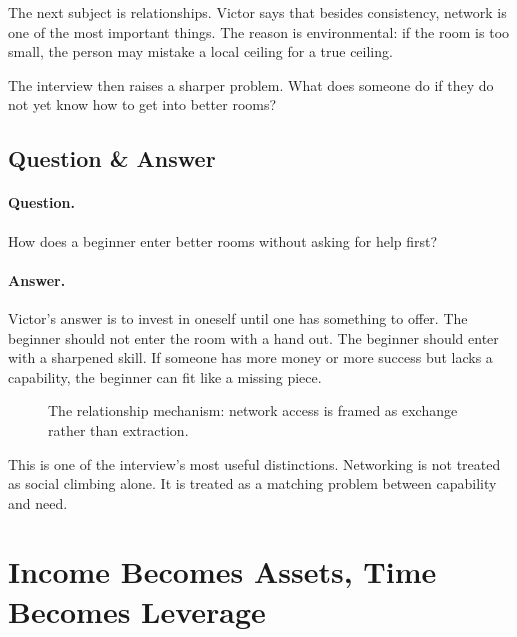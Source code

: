 The next subject is relationships. Victor says that besides consistency, network is one of the most important things. The reason is environmental: if the room is too small, the person may mistake a local ceiling for a true ceiling.

The interview then raises a sharper problem. What does someone do if they do not yet know how to get into better rooms?

\subsection{Question \& Answer}

\paragraph{Question.}
How does a beginner enter better rooms without asking for help first?

\paragraph{Answer.}
Victor's answer is to invest in oneself until one has something to offer. The beginner should not enter the room with a hand out. The beginner should enter with a sharpened skill. If someone has more money or more success but lacks a capability, the beginner can fit like a missing piece.

\begin{figure}[h]
\centering
{}
\caption{The relationship mechanism: network access is framed as exchange rather than extraction.}
\end{figure}

This is one of the interview's most useful distinctions. Networking is not treated as social climbing alone. It is treated as a matching problem between capability and need.

\section{Income Becomes Assets, Time Becomes Leverage}

